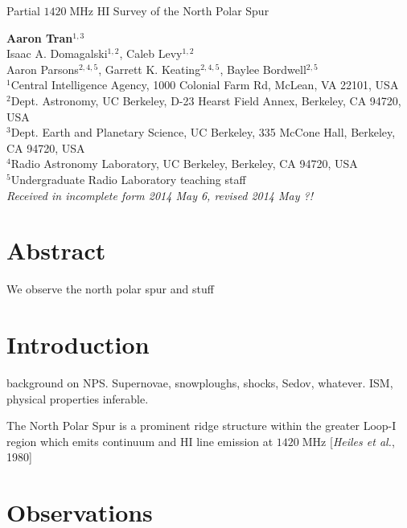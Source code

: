 \documentclass[10pt]{article}
\newcommand {\mt}{\mathrm}
\newcommand {\unit}[1]{\; \mt{#1}}
\begin{document}
\begin{center}
\Large{Partial $1420\unit{MHz}$ HI Survey of the North Polar Spur}

\normalsize
\textbf{Aaron Tran}${}^{1,3}$ \\
Isaac A. Domagalski${}^{1,2}$, Caleb Levy${}^{1,2}$ \\
Aaron Parsons${}^{2,4,5}$, Garrett K. Keating${}^{2,4,5}$, Baylee Bordwell${}^{2,5}$ \\
\footnotesize
${}^1$Central Intelligence Agency, 1000 Colonial Farm Rd, McLean, VA 22101, USA \\
${}^2$Dept. Astronomy, UC Berkeley, D-23 Hearst Field Annex, Berkeley, CA 94720, USA \\
${}^3$Dept. Earth and Planetary Science, UC Berkeley, 335 McCone Hall, Berkeley, CA 94720, USA \\
${}^4$Radio Astronomy Laboratory, UC Berkeley, Berkeley, CA 94720, USA \\
${}^5$Undergraduate Radio Laboratory teaching staff \\
\textit{Received in incomplete form 2014 May 6, revised 2014 May ?!}
\end{center}

\section*{Abstract}

We observe the north polar spur and stuff

\section{Introduction}

background on NPS.  Supernovae, snowploughs, shocks, Sedov, whatever.
ISM, physical properties inferable.

The North Polar Spur is a prominent ridge structure within the greater Loop-I region which emits continuum and HI line emission at $1420 \unit{MHz}$ [\textit{Heiles et al.}, 1980]

\section{Observations}

\end{document}
